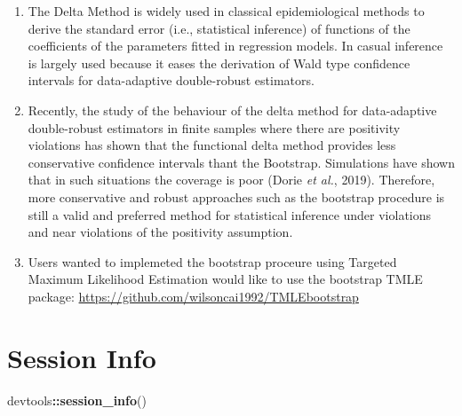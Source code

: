 \documentclass[]{article}
\newenvironment{Shaded}{\begin{snugshade}}{\end{snugshade}}
\newcommand{\KeywordTok}[1]{\textcolor[rgb]{0.13,0.29,0.53}{\textbf{#1}}}
\newcommand{\NormalTok}[1]{#1}
\newcommand{\OperatorTok}[1]{\textcolor[rgb]{0.81,0.36,0.00}{\textbf{#1}}}
\providecommand{\tightlist}{%
  \setlength{\itemsep}{0pt}\setlength{\parskip}{0pt}}
\begin{document}
\begin{enumerate}
\def\labelenumi{\arabic{enumi}.}
\tightlist
\item
  The Delta Method is widely used in classical epidemiological methods
  to derive the standard error (i.e., statistical inference) of
  functions of the coefficients of the parameters fitted in regression
  models. In casual inference is largely used because it eases the
  derivation of Wald type confidence intervals for data-adaptive
  double-robust estimators.
\item
  Recently, the study of the behaviour of the delta method for
  data-adaptive double-robust estimators in finite samples where there
  are positivity violations has shown that the functional delta method
  provides less conservative confidence intervals thant the Bootstrap.
  Simulations have shown that in such situations the coverage is poor
  (Dorie \emph{et al.}, 2019). Therefore, more conservative and robust
  approaches such as the bootstrap procedure is still a valid and
  preferred method for statistical inference under violations and near
  violations of the positivity assumption.
\item
  Users wanted to implemeted the bootstrap proceure using Targeted
  Maximum Likelihood Estimation would like to use the bootstrap TMLE
  package: \url{https://github.com/wilsoncai1992/TMLEbootstrap}
\end{enumerate}

\hypertarget{session-info}{%
\section{Session Info}\label{session-info}}

\begin{Shaded}
\begin{Highlighting}[]
\NormalTok{devtools}\OperatorTok{::}\KeywordTok{session_info}\NormalTok{()}
\end{Highlighting}
\end{Shaded}
\end{document}
